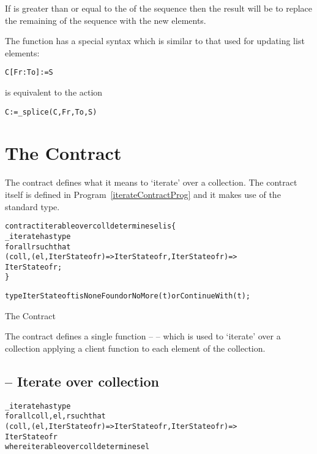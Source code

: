 If  is greater than or equal to the  of the sequence then the result will be to replace the remaining of the sequence with the new elements.

The  function has a special syntax which is similar to that used for updating list elements:
\begin{alltt}
C[Fr:To] := S
\end{alltt}
is equivalent to the action
\begin{alltt}
C := \_splice(C,Fr,To,S)
\end{alltt}

\section{The  Contract}
\label{iterableContract}
The  contract defines what it means to `iterate' over a collection. The contract itself is defined in Program~\vref{iterateContractProg} and it makes use of the standard  type.

\begin{program}[H]
\begin{alltt}
contract iterable over coll determines el is \{
  \_iterate has type 
    for all r such that 
      (coll,(el,IterState of r)=>IterState of r,IterState of r) => 
        IterState of r;
\}

type IterState of t is NoneFound or NoMore(t) or ContinueWith(t);
\end{alltt}
\caption{The  Contract\label{iterateContractProg}}
\end{program}

The  contract defines a single function --  -- which is used to `iterate' over a collection applying a client function to each element of the collection.

\subsection{ -- Iterate over collection}
\label{iterateFunction}
\begin{alltt}
\_iterate has type 
    for all coll, el, r such that 
      (coll,(el,IterState of r)=>IterState of r,IterState of r) => 
        IterState of r 
      where iterable over coll determines el
\end{alltt}

